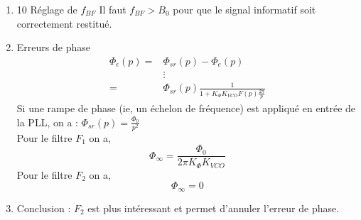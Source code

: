 \documentclass{article}
\begin{document}
\begin{enumerate}
Exprimons la FTBF pour le filtre F1
\begin{align*}
\frac{V_m(p)}{F_r(p)} &= \frac{1}{K_{VCO}} \frac{1}{1+\frac{1}{2\pi K_{\Phi} K_{VCO}}p + \frac{RC}{2\pi K_{\Phi} K_{VCO}}p^2}
\intertext{On identifie :}
f_{BF} &= \sqrt{\frac{K_{\Phi} K_{VCO}}{2\pi RC}}\\
\xi &= \frac{1}{2} \frac{1}{\sqrt{2\pi K_{\Phi} K_{VCO} RC}}
\end{align*}
Exprimons la FTBF pour le filtre $F_2$ :
\begin{align*}
\frac{V_m(p)}{F_r(p)} &=\frac{K_{\Phi}(\frac{1+R_1Cp}{R_2Cp})\frac{2\pi}{p}}{1+K_{\Phi}\frac{1+R_1Cp}{R_2Cp}K_{VCO}\frac{2\pi}{p}}\\
&= \frac{\frac{(1+R_1Cp)}{K_{VCO}}}{1+R_1Cp + \frac{R_2Cp^2}{2\pi K_{\Phi}K_{VCO}}}\\
f_{BF} &= \sqrt{\frac{K_{\Phi} K_{VCO}}{2\pi R_2C}}\\
\xi &= \frac{R_1C}{2} \sqrt{\frac{2\pi K_{\Phi} K_{VCO} RC}{R_2C}}
\end{align*}
Conclusion : Il est plus facile de régler la PLL avec $F_2$, car on peut régler indépendemment $f_{BF}$ et $\xi$ via $R_2$ et $R_1$

\item 10 Réglage de $f_{BF}$
Il faut $f_{BF} > B_0$ pour que le signal informatif soit correctement restitué.\\

\item Erreurs de phase\\
\begin{align*}
\Phi_{\epsilon}(p) =& \Phi_{sr}(p)-\Phi_e(p)\\ 
& \vdots\\
=& \Phi_{sr}(p)\frac{1}{1+K_{\Phi}K_{VCO}F(p) \frac{2\pi}{p}}
\end{align*}
Si une rampe de phase (ie, un échelon de fréquence) est appliqué en entrée de la PLL, on a : $ \Phi_{sr}(p) = \frac{\Phi_0}{p^2}$\\
Pour le filtre $F_1$ on a,
\[\Phi_{\infty} = \frac{\Phi_0}{2\pi K_{\Phi} K_{VCO}}\]
Pour le filtre $F_2$ on a,
\[\Phi_{\infty} = 0\]

\item Conclusion : $F_2$ est plus intéressant et permet d'annuler l'erreur de phase.


\end{enumerate}
\end{document}
